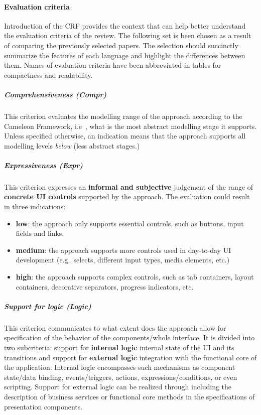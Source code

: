 \paragraph{Evaluation criteria}

Introduction of the CRF provides the context that can help better understand the evaluation criteria of the review.
The following set is been chosen as a result of comparing the previously selected papers.
The selection should succinctly summarize the features of each language and highlight the differences between them.
Names of evaluation criteria have been abbreviated in tables for compactness and readability.

\subparagraph{Comprehensiveness (Compr)}
This criterion evaluates the modelling range of the approach according to the Cameleon Framework, i.e\ , what is the most abstract modelling stage it supports.
Unless specified otherwise, an indication means that the approach supports all modelling levels \emph{below} (less abstract stages.)

\subparagraph{Expressiveness (Expr)}
This criterion expresses an \textbf{informal and subjective} judgement of the range of \textbf{concrete UI controls} supported by the approach.
The evaluation could result in three indications:
\begin{itemize}
    \item \textbf{low}: the approach only supports essential controls, such as buttons, input fields and links.
    \item \textbf{medium}: the approach supports more controls used in day-to-day UI development (e.g.\ selects, different input types, media elements, etc.)
    \item \textbf{high}: the approach supports complex controls, such as tab containers, layout containers, decorative separators, progress indicators, etc.
\end{itemize}

\subparagraph{Support for logic (Logic)}
This criterion communicates to what extent does the approach allow for specification of the behavior of the components/whole interface.
It is divided into two subcriteria: support for \textbf{internal logic}\,\textemdash\,internal state of the UI and its transitions and support for \textbf{external logic}\,\textemdash\,integration with the functional core of the application.
Internal logic encompasses such mechanisms as component state/data binding, events/triggers, actions, expressions/conditions, or even scripting.
Support for external logic can be realized through including the description of business services or functional core methods in the specifications of presentation components.

